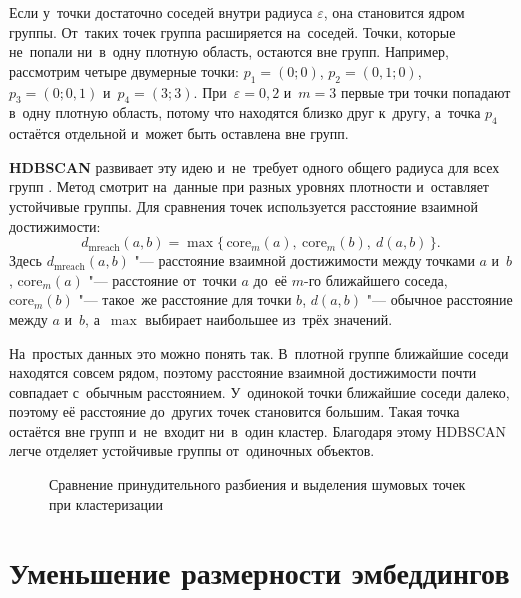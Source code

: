 Если у~точки достаточно соседей внутри радиуса \( \varepsilon \), она становится
ядром группы. От~таких точек группа расширяется на~соседей. Точки, которые
не~попали ни~в~одну плотную область, остаются вне групп. Например, рассмотрим
четыре двумерные точки: \(p_1=(0;0)\), \(p_2=(0{,}1;0)\),
\(p_3=(0;0{,}1)\) и~\(p_4=(3;3)\). При~\(\varepsilon=0{,}2\) и~\(m=3\)
первые три точки попадают в~одну плотную область, потому что находятся близко
друг к~другу, а~точка \(p_4\) остаётся отдельной и~может быть оставлена вне
групп.

\textbf{HDBSCAN} развивает эту идею и~не~требует одного общего радиуса для всех групп
\autocite{McInnes2017HDBSCAN}. Метод смотрит на~данные при
разных уровнях плотности и~оставляет устойчивые группы. Для сравнения точек
используется расстояние взаимной достижимости:
\begin{equation}
    \label{eq:mreach}
    d_{\mathrm{mreach}}(a,b) =
    \max\{\,\mathrm{core}_m(a),\ \mathrm{core}_m(b),\ d(a,b)\,\}.
\end{equation}
Здесь \( d_{\mathrm{mreach}}(a,b) \) "--- расстояние взаимной достижимости
между точками \( a \) и~\( b \), \( \mathrm{core}_m(a) \) "--- расстояние
от~точки \( a \) до~её \( m \)-го ближайшего соседа, \( \mathrm{core}_m(b) \)
"--- такое~же расстояние для точки \( b \), \( d(a,b) \) "--- обычное расстояние
между \( a \) и~\( b \), а~\( \max \) выбирает наибольшее из~трёх значений.

На~простых данных это можно понять так. В~плотной группе ближайшие соседи
находятся совсем рядом, поэтому расстояние взаимной достижимости почти совпадает
с~обычным расстоянием. У~одинокой точки ближайшие соседи далеко, поэтому её
расстояние до~других точек становится большим. Такая точка остаётся вне групп
и~не~входит ни~в~один кластер. Благодаря этому HDBSCAN легче отделяет
устойчивые группы от~одиночных объектов.

\begin{figure}[htbp]
    \centering
    \resizebox{\textwidth}{!}{%
    }
    \caption{Сравнение принудительного разбиения и выделения шумовых точек при кластеризации}\label{fig:ch1/clustering-outliers}
\end{figure}
\FloatBarrier

\section{Уменьшение размерности эмбеддингов}\label{sec:ch1/umap}

